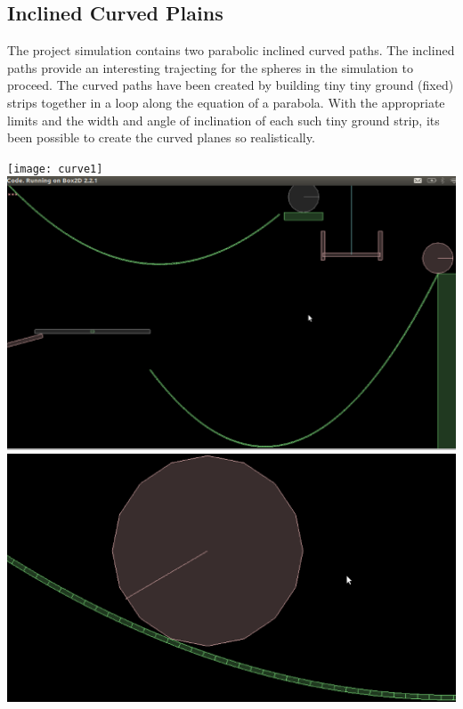 \documentclass[11pt]{article}
\begin{document}
\subsection{Inclined Curved Plains}
The project simulation contains two parabolic inclined curved paths. The inclined paths provide an interesting trajecting for the spheres in the simulation to proceed. The curved paths have been created by building tiny tiny ground (fixed) strips together in a loop along the equation of a parabola. With the appropriate limits and the width and angle of inclination of each such tiny ground strip, its been possible to create the curved planes so realistically. 
\begin{center}
\texttt{[image: curve1]}
\includegraphics[scale=0.3]{curve2}
\includegraphics[scale=0.3]{curve3}
\end{center}
\end{document}
